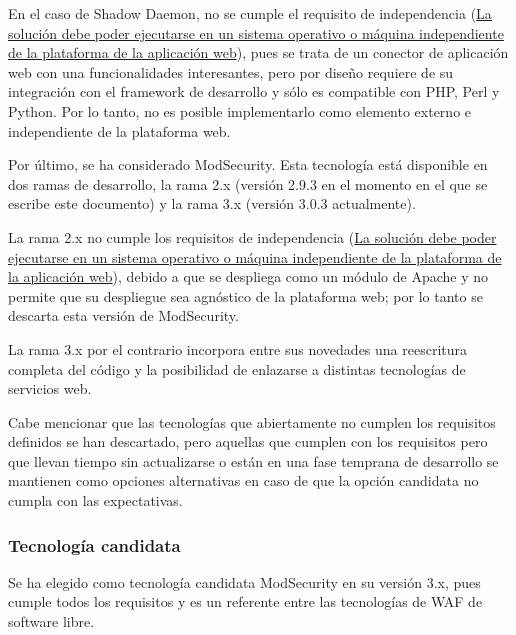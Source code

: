\par En el caso de Shadow Daemon, no se cumple el requisito de independencia ({\hyperref[req:independence]{La solución debe poder ejecutarse en un
sistema operativo o máquina independiente de la plataforma de la aplicación web}}), pues se trata de un conector de aplicación web con una
funcionalidades interesantes, pero por diseño requiere de su integración con el framework de desarrollo y sólo es compatible con PHP, Perl y Python. Por
lo tanto, no es posible implementarlo como elemento externo e independiente de la plataforma web.

\par Por último, se ha considerado ModSecurity. Esta tecnología está disponible en dos ramas de desarrollo, la rama 2.x (versión 2.9.3 en el momento en
el que se escribe este documento) y la rama 3.x (versión 3.0.3 actualmente).
\par La rama 2.x no cumple los requisitos de independencia ({\hyperref[req:independence]{La solución debe poder ejecutarse en un sistema operativo o
máquina independiente de la plataforma de la aplicación web}}), debido a que se despliega como un módulo de Apache y no permite que su despliegue sea
agnóstico de la plataforma web; por lo tanto se descarta esta versión de ModSecurity.

\par La rama 3.x por el contrario incorpora entre sus novedades una reescritura completa del código y la posibilidad de enlazarse a distintas
tecnologías de servicios web.

\par Cabe mencionar que las tecnologías que abiertamente no cumplen los requisitos definidos se han descartado, pero aquellas que cumplen con los
requisitos pero que llevan tiempo sin actualizarse o están en una fase temprana de desarrollo se mantienen como opciones alternativas en caso de que la
opción candidata no cumpla con las expectativas.
\subsubsection{Tecnología candidata}
\par Se ha elegido como tecnología candidata ModSecurity en su versión 3.x, pues cumple todos los requisitos y es un referente entre las tecnologías de
WAF de software libre.

